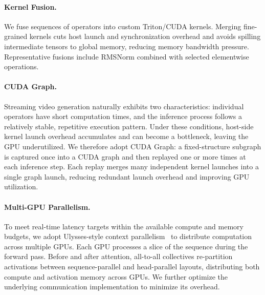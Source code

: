 \paragraph{Kernel Fusion.}
We fuse sequences of operators into custom Triton/CUDA kernels. Merging fine-grained kernels cuts host launch and synchronization overhead and avoids spilling intermediate tensors to global memory, reducing memory bandwidth pressure. Representative fusions include RMSNorm combined with selected elementwise operations.

\paragraph{CUDA Graph.}
Streaming video generation naturally exhibits two characteristics: individual operators have short computation times, and the inference process follows a relatively stable, repetitive execution pattern. Under these conditions, host-side kernel launch overhead accumulates and can become a bottleneck, leaving the GPU underutilized. We therefore adopt CUDA Graph: a fixed-structure subgraph is captured once into a CUDA graph and then replayed one or more times at each inference step. Each replay merges many independent kernel launches into a single graph launch, reducing redundant launch overhead and improving GPU utilization.

\paragraph{Multi-GPU Parallelism.}
To meet real-time latency targets within the available compute and memory budgets, we adopt Ulysses-style context parallelism~\cite{jacobs2023deepspeed} to distribute computation across multiple GPUs. Each GPU processes a slice of the sequence during the forward pass. Before and after attention, all-to-all collectives re-partition activations between sequence-parallel and head-parallel layouts, distributing both compute and activation memory across GPUs. We further optimize the underlying communication implementation to minimize its overhead.
